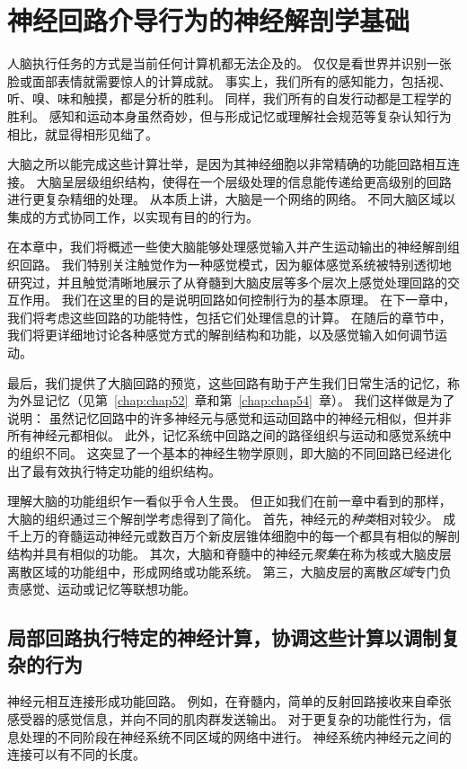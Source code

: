 \chapter{神经回路介导行为的神经解剖学基础} \label{chap:chap4}

人脑执行任务的方式是当前任何计算机都无法企及的。
仅仅是看世界并识别一张脸或面部表情就需要惊人的计算成就。
事实上，我们所有的感知能力，包括视、听、嗅、味和触摸，都是分析的胜利。
同样，我们所有的自发行动都是工程学的胜利。
感知和运动本身虽然奇妙，但与形成记忆或理解社会规范等复杂认知行为相比，就显得相形见绌了。


大脑之所以能完成这些计算壮举，是因为其神经细胞以非常精确的功能回路相互连接。
大脑呈层级组织结构，使得在一个层级处理的信息能传递给更高级别的回路进行更复杂精细的处理。 
从本质上讲，大脑是一个网络的网络。 
不同大脑区域以集成的方式协同工作，以实现有目的的行为。


在本章中，我们将概述一些使大脑能够处理感觉输入并产生运动输出的神经解剖组织回路。
我们特别关注触觉作为一种感觉模式，因为躯体感觉系统被特别透彻地研究过，并且触觉清晰地展示了从脊髓到大脑皮层等多个层次上感觉处理回路的交互作用。
我们在这里的目的是说明回路如何控制行为的基本原理。 
在下一章中，我们将考虑这些回路的功能特性，包括它们处理信息的计算。 
在随后的章节中，我们将更详细地讨论各种感觉方式的解剖结构和功能，以及感觉输入如何调节运动。


最后，我们提供了大脑回路的预览，这些回路有助于产生我们日常生活的记忆，称为外显记忆（见第~\ref{chap:chap52}~章和第~\ref{chap:chap54}~章）。
我们这样做是为了说明：
虽然记忆回路中的许多神经元与感觉和运动回路中的神经元相似，但并非所有神经元都相似。
此外，记忆系统中回路之间的路径组织与运动和感觉系统中的组织不同。
这突显了一个基本的神经生物学原则，即大脑的不同回路已经进化出了最有效执行特定功能的组织结构。


理解大脑的功能组织乍一看似乎令人生畏。 
但正如我们在前一章中看到的那样，大脑的组织通过三个解剖学考虑得到了简化。
首先，神经元的\textit{种类}相对较少。 
成千上万的脊髓运动神经元或数百万个新皮层锥体细胞中的每一个都具有相似的解剖结构并具有相似的功能。 
其次，大脑和脊髓中的神经元\textit{聚集}在称为核或大脑皮层离散区域的功能组中，形成网络或功能系统。 
第三，大脑皮层的离散\textit{区域}专门负责感觉、运动或记忆等联想功能。


\section{局部回路执行特定的神经计算，协调这些计算以调制复杂的行为}

神经元相互连接形成功能回路。 
例如，在脊髓内，简单的反射回路接收来自牵张感受器的感觉信息，并向不同的肌肉群发送输出。
对于更复杂的功能性行为，信息处理的不同阶段在神经系统不同区域的网络中进行。
神经系统内神经元之间的连接可以有不同的长度。


